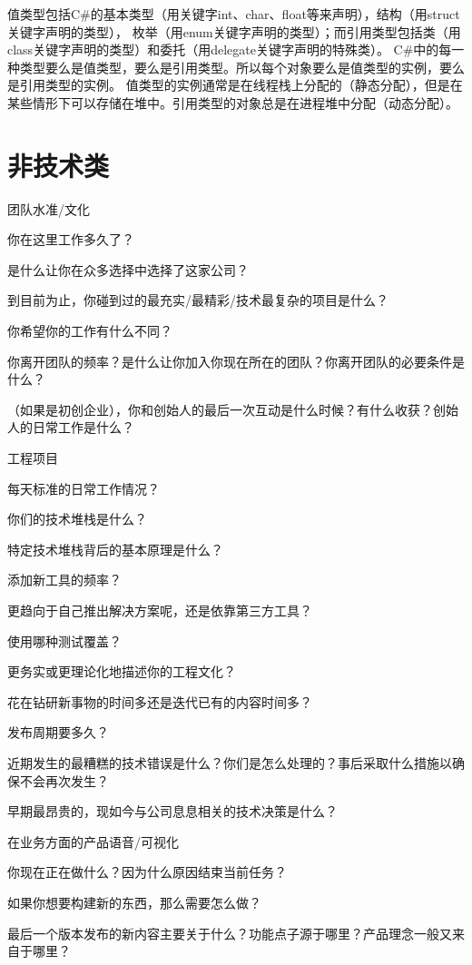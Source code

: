 \documentclass{book}
\begin{document}
值类型包括C\#的基本类型（用关键字int、char、float等来声明），结构（用struct关键字声明的类型），
枚举（用enum关键字声明的类型）；而引用类型包括类（用class关键字声明的类型）和委托（用delegate关键字声明的特殊类）。
C\#中的每一种类型要么是值类型，要么是引用类型。所以每个对象要么是值类型的实例，要么是引用类型的实例。
值类型的实例通常是在线程栈上分配的（静态分配），但是在某些情形下可以存储在堆中。引用类型的对象总是在进程堆中分配（动态分配）。

\section{非技术类}

团队水准/文化

你在这里工作多久了？

是什么让你在众多选择中选择了这家公司？

到目前为止，你碰到过的最充实/最精彩/技术最复杂的项目是什么？

你希望你的工作有什么不同？

你离开团队的频率？是什么让你加入你现在所在的团队？你离开团队的必要条件是什么？

（如果是初创企业），你和创始人的最后一次互动是什么时候？有什么收获？创始人的日常工作是什么？

工程项目

每天标准的日常工作情况？

你们的技术堆栈是什么？

特定技术堆栈背后的基本原理是什么？

添加新工具的频率？

更趋向于自己推出解决方案呢，还是依靠第三方工具？

使用哪种测试覆盖？

更务实或更理论化地描述你的工程文化？

花在钻研新事物的时间多还是迭代已有的内容时间多？

发布周期要多久？

近期发生的最糟糕的技术错误是什么？你们是怎么处理的？事后采取什么措施以确保不会再次发生？

早期最昂贵的，现如今与公司息息相关的技术决策是什么？

在业务方面的产品语音/可视化

你现在正在做什么？因为什么原因结束当前任务？

如果你想要构建新的东西，那么需要怎么做？

最后一个版本发布的新内容主要关于什么？功能点子源于哪里？产品理念一般又来自于哪里？
\end{document}
